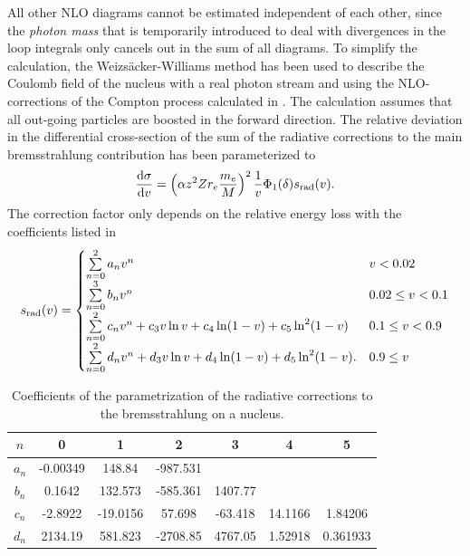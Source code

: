 All other NLO diagrams cannot be estimated independent of each other, since the \textit{photon mass} that is temporarily introduced to deal with divergences in the loop integrals only cancels out in the sum of all diagrams.
To simplify the calculation, the Weizsäcker-Williams method has been used to describe the Coulomb field of the nucleus with a real photon stream and using the NLO-corrections of the Compton process calculated in \cite{Brown52}.
The calculation assumes that all out-going particles are boosted in the forward direction.
The relative deviation in the differential cross-section of the sum of the radiative corrections to the main bremsstrahlung contribution has been parameterized to
\begin{align}
\frac{\mathrm{d} \sigma}{\mathrm{d} v} =
    \left( \alpha z^2 Z r_e \frac{m_e}{M} \right)^2 \frac{1}{v}
    \Phi_1(\delta) s_{\text{rad}}(v) .
\end{align}
The correction factor only depends on the relative energy loss with the coefficients listed in 
\begin{align}
s_{\text{rad}}(v) =
    \begin{cases}
        \sum\limits_{n=0}^2 a_n v^n & v < 0.02 \\
        \sum\limits_{n=0}^3 b_n v^n & 0.02 \leq v < 0.1 \\
        \sum\limits_{n=0}^2 c_n v^n + c_3v \operatorname{ln} v  + c_4 \operatorname{ln}(1-v) + c_5 \operatorname{ln}^2(1-v) & 0.1 \leq v < 0.9 \\
        \sum\limits_{n=0}^2 d_n v^n + d_3v \operatorname{ln} v + d_4 \operatorname{ln}(1 - v) + d_5 \operatorname{ln}^2(1-v). & 0.9 \leq v
    \end{cases}
\end{align}

\begin{table}
    \caption{Coefficients of the parametrization of the radiative corrections to the bremsstrahlung on a nucleus.}
    \label{tab:brems_rad}
    \begin{center}
    \begin{tabular}{c S[table-format=4.5] S[table-format=3.5] S[table-format=+4.3] S[table-format=4.3] S[table-format=2.5] S[table-format=1.6]}
        \toprule
        $n$ & {0} & {1} & {2} & {3} & {4} & {5} \\
        \midrule
        $a_n$ & -0.00349 & 148.84 & -987.531 & & & \\
        $b_n$ & 0.1642 & 132.573 & -585.361 & 1407.77 & & \\
        $c_n$ & -2.8922 & -19.0156 & 57.698 & -63.418 & 14.1166 & 1.84206 \\
        $d_n$ & 2134.19 & 581.823 & -2708.85 & 4767.05 & 1.52918 & 0.361933 \\
        \bottomrule
    \end{tabular}
    \end{center}
\end{table}

